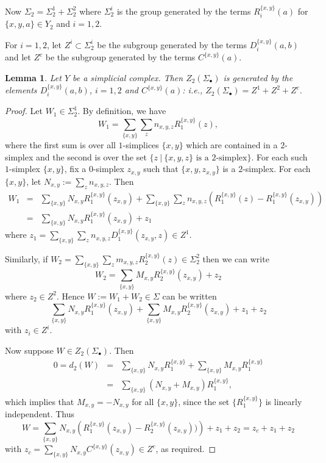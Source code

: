 \documentclass[12pt]{amsart}
\newtheorem{lem}{Lemma}[section]
\theoremstyle{definition}
\newcommand{\<}{\langle}
\renewcommand{\>}{\rangle}
\begin{document}
Now $\Sigma_2=\Sigma_2^1+\Sigma_2^2$ where $\Sigma_2^i$ is the group generated by the terms $R_i^{\{ x,y\}}(a)$ for $\{ x,y,a\}\in Y_2$ and $i=1,2$.

For $i=1,2$, let $Z^i\subset \Sigma_2^i$ be the subgroup generated by the terms $D_i^{\{ x,y\}}(a,b)$ and let $Z^c$ be the subgroup generated by the terms $C^{\{ x,y\}}(a)$.

\begin{lem}\label{lem:z}
 Let $Y$ be a simplicial complex. Then $Z_2(\Sigma_\bullet)$ is generated by the elements $D_i^{\{ x,y\}}(a,b)$, $i=1,2$ and $C^{\{ x,y\}}(a)$: i.e., $Z_2(\Sigma_\bullet)=Z^1+Z^2+Z^c$.
\end{lem}

\begin{proof} Let $W_1\in \Sigma_2^1$. By definition, we have 
\[
W_1=\sum_{\{ x,y\}}\sum_z n_{x,y,z}R_1^{\{ x,y\}}(z),
\]
where the first sum is over all $1$-simplices $\{ x,y\}$ which are contained in a $2$-simplex and the second is over the set $\{ z\ |\ \{ x,y,z\} \mbox{ is a $2$-simplex}\}$.
For each such $1$-simplex $\{ x,y\}$, fix a $0$-simplex $z_{x,y}$ such that $\{ x,y,z_{x,y}\}$ is a $2$-simplex. For each $\{ x,y\}$, let $N_{x,y}:=
\sum_z n_{x,y,z}$. Then
\begin{eqnarray*}
W_1&=& \sum_{\{ x,y\}}N_{x,y}R_1^{\{ x,y\}}(z_{x,y})+\sum_{\{ x,y\}}\sum_z n_{x,y,z}\left(R_1^{\{ x,y\}}(z)-R_1^{\{ x,y\}}(z_{x,y})\right)\\
&=& \sum_{\{ x,y\}}N_{x,y}R_1^{\{ x,y\}}(z_{x,y}) +z_1
\end{eqnarray*}
where $z_1=\sum_{\{ x,y\}}\sum_z n_{x,y,z}D_1^{\{ x,y\}}(z_{x,y},z)\in Z^1$.

Similarly, if $W_2=\sum_{\{ x,y\}}\sum_z m_{x,y,z}R_2^{\{ x,y\}}(z)\in \Sigma_2^2$ then we can write 
\[
W_2= \sum_{\{ x,y\}}M_{x,y}R_2^{\{ x,y\}}(z_{x,y})+z_2
\]
where $z_2\in Z^2$.  Hence $W:=W_1+W_2\in \Sigma$ can be written 
\[
 \sum_{\{ x,y\}}N_{x,y}R_1^{\{ x,y\}}(z_{x,y})+ \sum_{\{ x,y\}}M_{x,y}R_2^{\{ x,y\}}(z_{x,y})+z_1+z_2
\]
with $z_i\in Z^i$.

Now suppose $W\in Z_2(\Sigma_\bullet)$. Then
 \begin{eqnarray*}
0=d_2(W)&=&  \sum_{\{ x,y\}}N_{x,y}R_1^{\{ x,y\}}+ \sum_{\{ x,y\}}M_{x,y}R_1^{\{ x,y\}}\\
&=& \sum_{\{ x,y\}}(N_{x,y}+M_{x,y})R_1^{\{ x,y\}},
\end{eqnarray*}
which implies that $M_{x,y}=-N_{x,y}$ for all $\{ x,y\}$, since the set $\{ R_1^{\{ x,y\}}\}$ is linearly independent. Thus
\[
W= \sum_{\{ x,y\}}N_{x,y}\left(R_1^{\{ x,y\}}(z_{x,y})-R_2^{\{ x,y\}}(z_{x,y}))\right)+z_1+z_2=z_c+z_1+z_2
\]
with $z_c= \sum_{\{ x,y\}}N_{x,y}C^{\{ x,y\}}(z_{x,y})\in Z^c$, as required.
\end{proof}
\end{document}
